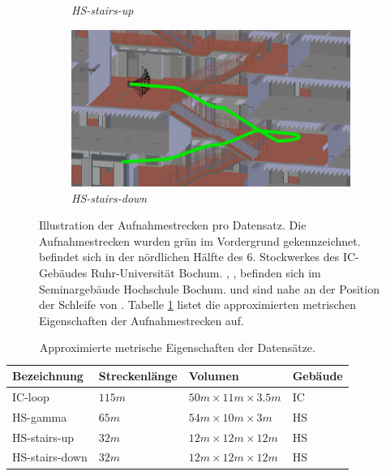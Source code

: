 \begin{figure}[htp]
\begin{subfigure}[tr]{0.45\linewidth}
		\caption{\textit{HS-stairs-up}}
		\label{subfig:traj_hs-up}
	\end{subfigure}
	\hfill
	\begin{subfigure}[tl]{0.45\linewidth}
		\flushright		\includegraphics[width=\linewidth]{images/trajectories/traj-stairs-down.png}
		\caption{\textit{HS-stairs-down}}
		\label{subfig:traj_hs-down}
	\end{subfigure}
	\hfill
	\caption{Illustration der Aufnahmestrecken pro Datensatz. Die Aufnahmestrecken wurden grün im Vordergrund gekennzeichnet.  befindet sich in der nördlichen Hälfte des 6. Stockwerkes des IC-Gebäudes Ruhr-Universität Bochum. , ,  befinden sich im Seminargebäude Hochschule Bochum.  und  sind nahe an der Position der Schleife von . Tabelle \ref{tab:dataset_metrics} listet die approximierten metrischen Eigenschaften der Aufnahmestrecken auf.}
	\label{fig:trajectories}
\end{figure}

\cleardoublepage
\vspace*{\fill}
\begin{table}[H]
	\centering
	\caption{Approximierte metrische Eigenschaften der Datensätze.}
	\begin{tabularx}{1.0\textwidth}{X X X >{\centering\arraybackslash}p{1.7cm} }
		\textbf{Bezeichnung} & \textbf{Streckenlänge} & \textbf{Volumen} & \textbf{Gebäude}\\
		\hline
		IC-loop & $115m$ & $50m \times 11m \times 3.5m$ & IC \\
		\hline
		HS-gamma & $65m$ & $54m \times 10m \times 3m$ & HS\\
		\hline
		HS-stairs-up & $32m$ & $12m \times 12m \times 12m$ & HS\\
		\hline
		HS-stairs-down & $32m$ & $12m \times 12m \times 12m$ & HS\\
	\end{tabularx}
	\label{tab:dataset_metrics}
\end{table}

